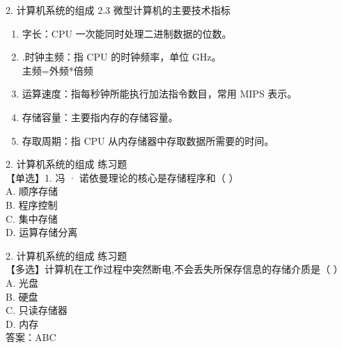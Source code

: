 \documentclass[aspectratio=169]{beamer}
\begin{document}
\begin{frame}[t]{2. 计算机系统的组成} \vspace{20pt}
    2.3 微型计算机的主要技术指标\\
    \begin{enumerate}
        \item{字长：CPU 一次能同时处理二进制数据的位数。}\\
        \item{.时钟主频：指 CPU 的时钟频率，单位 GHz。}\\
            主频=外频*倍频\\
        \item{运算速度：指每秒钟所能执行加法指令数目，常用 MIPS 表示。}\\
        \item{存储容量：主要指内存的存储容量。}\\
        \item{存取周期：指 CPU 从内存储器中存取数据所需要的时间。}\\

    \end{enumerate}

\end{frame}




\begin{frame}[t]{2. 计算机系统的组成} \vspace{20pt}
    练习题\\
    【单选】1. 冯 · 诺依曼理论的核心是存储程序和（ ）\\
    A. 顺序存储\\ B. 程序控制\\
    C. 集中存储\\ D. 运算存储分离\\


\end{frame}



\begin{frame}[t]{2. 计算机系统的组成} \vspace{20pt}
    练习题\\
    【多选】计算机在工作过程中突然断电,不会丢失所保存信息的存储介质是（ ）\\
    A. 光盘 \\
    B. 硬盘\\
    C. 只读存储器\\
    D. 内存\\
    答案：ABC\\


\end{frame}
\end{document}
